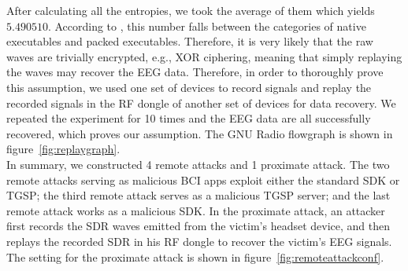 %
\indent After calculating all the entropies, we took the average of them which yields $5.490510$. According to \cite{lyda2007using}, this number falls between the categories of native executables and packed executables. Therefore, it is very likely that the raw waves are trivially encrypted, e.g., XOR ciphering, meaning that simply replaying the waves may recover the EEG data. Therefore, in order to thoroughly prove this assumption, we used one set of devices to record signals and replay the recorded signals in the RF dongle of another set of devices for data recovery. We repeated the experiment for 10 times and the EEG data are all successfully recovered, which proves our assumption. The GNU Radio flowgraph is shown in figure~\ref{fig:replaygraph}.\\
%
\indent In summary, we constructed 4 remote attacks and 1 proximate attack. The two remote attacks serving as malicious BCI apps exploit either the standard SDK or TGSP; the third remote attack serves as a malicious TGSP server; and the last remote attack works as a malicious SDK. In the proximate attack, an attacker first records the SDR waves emitted from the victim's headset device, and then replays the recorded SDR in his RF dongle to recover the victim's EEG signals. The setting for the proximate attack is shown in figure~\ref{fig:remoteattackconf}.
